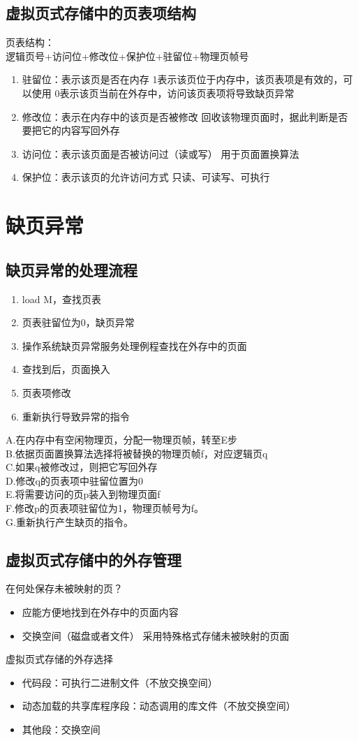 \subsection{虚拟页式存储中的页表项结构}
页表结构：\\
逻辑页号+访问位+修改位+保护位+驻留位+物理页帧号
\begin{enumerate}
	\item 驻留位：表示该页是否在内存
	\subitem 1表示该页位于内存中，该页表项是有效的，可以使用
	\subitem 0表示该页当前在外存中，访问该页表项将导致缺页异常
	\item 修改位：表示在内存中的该页是否被修改
	\subitem 回收该物理页面时，据此判断是否要把它的内容写回外存
	\item 访问位：表示该页面是否被访问过（读或写）
	\subitem 用于页面置换算法
	\item 保护位：表示该页的允许访问方式
	\subitem 只读、可读写、可执行
\end{enumerate}

\section{缺页异常}
\subsection{缺页异常的处理流程}
\begin{enumerate}[A]
	\item load M，查找页表
	\item 页表驻留位为0，缺页异常
	\item 操作系统缺页异常服务处理例程查找在外存中的页面
	\item 查找到后，页面换入
	\item 页表项修改
	\item 重新执行导致异常的指令
\end{enumerate}
A.在内存中有空闲物理页，分配一物理页帧，转至E步\\
B.依据页面置换算法选择将被替换的物理页帧f，对应逻辑页q\\
C.如果q被修改过，则把它写回外存\\
D.修改q的页表项中驻留位置为0\\
E.将需要访问的页p装入到物理页面f\\
F.修改p的页表项驻留位为1，物理页帧号为f。\\
G.重新执行产生缺页的指令。
\subsection{虚拟页式存储中的外存管理}
在何处保存未被映射的页？
\begin{itemize}
	\item 应能方便地找到在外存中的页面内容
	\item 交换空间（磁盘或者文件）
	\subitem 采用特殊格式存储未被映射的页面
\end{itemize}
虚拟页式存储的外存选择
\begin{itemize}
	\item 代码段：可执行二进制文件（不放交换空间）
	\item 动态加载的共享库程序段：动态调用的库文件（不放交换空间）
	\item 其他段：交换空间
\end{itemize}
